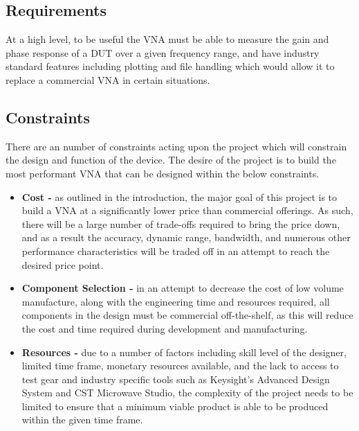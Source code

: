 \subsection{Requirements}
\label{subsec:requirements}
At a high level, to be useful the VNA must be able to measure the gain and phase response of a DUT over a given frequency range, and have industry standard features including plotting and file handling which would allow it to replace a commercial VNA in certain situations. 

\subsection{Constraints}
\label{subsec:contraints}
There are an number of constraints acting upon the project which will constrain the design and function of the device. The desire of the project is to build the most performant VNA that can be designed within the below constraints. 

\begin{itemize}
	\item \textbf{Cost -} as outlined in the introduction, the major goal of this project is to build a VNA at a significantly lower price than commercial offerings. As such, there will be a large number of trade-offs required to bring the price down, and as a result the accuracy, dynamic range, bandwidth, and numerous other performance characteristics will be traded off in an attempt to reach the desired price point.
	\item \textbf{Component Selection -} in an attempt to decrease the cost of low volume manufacture, along with the engineering time and resources required, all components in the design must be commercial off-the-shelf, as this will reduce the cost and time required during development and manufacturing. 
	\item \textbf{Resources -} due to a number of factors including skill level of the designer, limited time frame, monetary resources available, and the lack to access to test gear and industry specific tools such as Keysight's Advanced Design System and CST Microwave Studio, the complexity of the project needs to be limited to ensure that a minimum viable product is able to be produced within the given time frame.   
\end{itemize}

